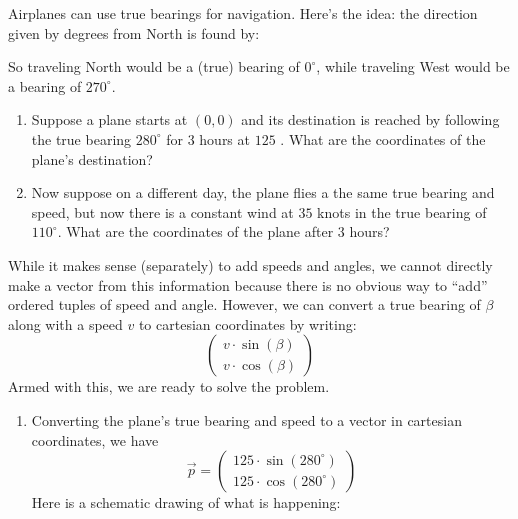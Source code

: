 \documentclass{ximera}
\begin{document}
\begin{example}[Navigation]
  Airplanes can use true bearings for navigation. Here's the idea: the
  direction given by degrees from North is found by:

\begin{center}
\upshape
\def\radius{2cm}
\def\onedegrad{1.8cm}
\def\fivedegrad{1.75cm}
\def\tendegrad{1.7cm}
\def\labelrad{1.6cm}

\end{center}

So traveling North would be a (true) bearing of $0^\circ$, while
traveling West would be a bearing of $270^\circ$.
\begin{enumerate}
\item Suppose a plane starts at $(0,0)$ and its destination is reached
  by following the true bearing $280^\circ$ for $3$ hours at $125$
  .  What are
  the coordinates of the plane's destination?
\item Now suppose on a different day, the plane flies a the same true
  bearing and speed, but now there is a constant wind at $35$ knots in
  the true bearing of $110^\circ$. What are the coordinates of the
  plane after $3$ hours?
\end{enumerate}

\begin{explanation}
While it makes sense (separately) to add speeds and angles, we cannot
directly make a vector from this information because there is no
obvious way to ``add'' ordered tuples of speed and angle. However, we
can convert a true bearing of $\beta$ along with a speed $v$ to
cartesian coordinates by writing:
\[
\begin{pmatrix}v\cdot \sin(\beta)\\ v \cdot \cos(\beta)\end{pmatrix}
\]
Armed with this, we are ready to solve the problem.
\begin{enumerate}
\item  Converting the plane's true bearing and speed to a vector in cartesian
  coordinates, we have
  \[
  \vec{p} = \begin{pmatrix}125\cdot \sin(280^\circ)\\ 125 \cdot \cos(280^\circ)\end{pmatrix}
  \]
  Here is a schematic drawing of what is happening:


\end{enumerate}
\end{explanation}
\end{example}
\end{document}
